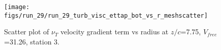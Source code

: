 \begin{figure}[H]
\centering
\texttt{[image: figs/run\_29/run\_29\_turb\_visc\_ettap\_bot\_vs\_r\_meshscatter]}
\caption{Scatter plot of $\nu_T$ velocity gradient term vs radius at $z/c$=7.75, $V_{free}$=31.26, station 3.}
\label{fig:run_29_turb_visc_ettap_bot_vs_r_meshscatter}
\end{figure}


